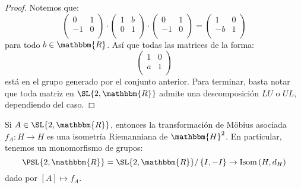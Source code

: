 \documentclass[12pt]{report}
\theoremstyle{largebreak}
\newcommand\cf[3]{\ensuremath{#1:#2\rightarrow#3}}
\newcommand{\bbm}[1]{\ensuremath{\mathbbm{#1}}}
\newcommand{\Isom}[1]{\ensuremath{\textup{Isom}\left(#1\right)}}
\begin{document}
    \begin{proof}
        Notemos que:
        \begin{equation*}
            \left(\begin{array}{cc}
                0 & 1 \\
                -1 & 0 \\
            \end{array} \right)\cdot\left(\begin{array}{cc}
                1 & b \\
                0 & 1 \\
            \end{array} \right)\cdot\left(\begin{array}{cc}
                0 & 1 \\
                -1 & 0 \\
            \end{array} \right)=\left(\begin{array}{cc}
                1 & 0 \\
                -b & 1 \\
            \end{array} \right)
        \end{equation*}
        para todo $b\in\bbm{R}$. Así que todas las matrices de la forma:
        \begin{equation*}
            \left(\begin{array}{cc}
                1 & 0 \\
                a & 1 \\
            \end{array} \right)
        \end{equation*}
        está en el grupo generado por el conjunto anterior. Para terminar, basta notar que toda matriz en $\SL{2,\bbm{R}}$ admite una descomposición $LU$ o $UL$, dependiendo del caso.
    \end{proof}

    \begin{propo}
        Si $A\in\SL{2,\bbm{R}}$, entonces la transformación de Möbius asociada $\cf{f_A}{H}{H}$ es una isometría Riemanniana de $\bbm{H}^2$. En particular, tenemos un monomorfismo de grupos:
        \begin{equation*}
            \PSL{2,\bbm{R}}=\SL{2,\bbm{R}}/\left\{I,-I \right\}\rightarrow\Isom{H,d_H}
        \end{equation*}
        dado por $[A]\mapsto f_A$.
    \end{propo}
\end{document}
